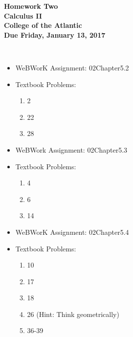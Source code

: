 \documentclass[12pt]{article}
\begin{document}
\pagestyle{empty}
 
\begin{center}
{\LARGE {\bf Homework Two}}\\
\bigskip
{\Large {\bf Calculus II}}\\
\bigskip
{\Large {\bf College of the Atlantic}}\\
\bigskip
{ {\bf Due Friday, January 13, 2017}}\\ 
\end{center}



 \\ 


\begin{itemize}
  \item WeBWorK Assignment: 02Chapter5.2

\item Textbook Problems:

\begin{enumerate}
\setlength{\itemsep}{-1mm}
  \item 2
  \item 22
  \item 28

\end{enumerate}

\end{itemize}


\begin{itemize}
\item WeBWork Assignment: 02Chapter5.3

\item Textbook Problems:

\begin{enumerate}
\setlength{\itemsep}{-1mm}
  \item 4
  \item 6
  \item 14
\end{enumerate}

\end{itemize}



\begin{itemize}
  \item WeBWorK Assignment: 02Chapter5.4

  \item Textbook Problems:
\begin{enumerate}
\setlength{\itemsep}{-1mm}
  \item 10
  \item 17 
  \item 18
  \item 26 (Hint: Think geometrically)
  \item 36-39
\end{enumerate}
\end{itemize}
\end{document}
